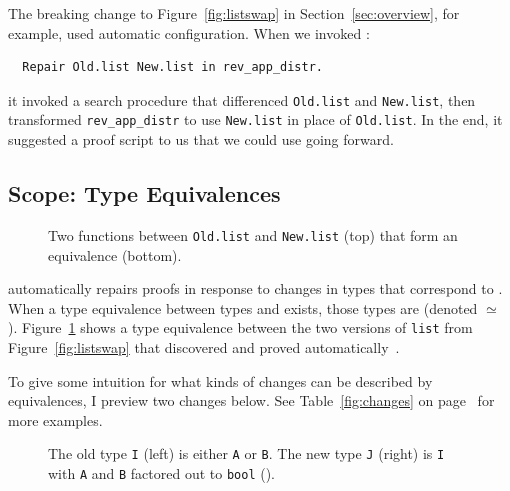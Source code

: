 The breaking change to Figure~\ref{fig:listswap} in Section~\ref{sec:overview}, for example, used automatic configuration.
When we invoked \toolnamec:

\begin{lstlisting}
  Repair Old.list New.list in rev_app_distr.
\end{lstlisting}
it invoked a search procedure that differenced \lstinline{Old.list} and \lstinline{New.list},
then transformed \lstinline{rev_app_distr} to use \lstinline{New.list} in place of \lstinline{Old.list}.
In the end, it suggested a proof script to us that we could use going forward.

\subsection{Scope: Type Equivalences}
\label{sec:pi-scope}

\begin{figure}
\caption{Two functions between \lstinline{Old.list} and \lstinline{New.list} (top) that form an equivalence (bottom).}
\label{fig:equivalence}
\end{figure}

\toolnamec automatically repairs proofs in response to changes in types that correspond to .
When a type equivalence between types \Aa and \B exists, those types are  (denoted \Aa $\simeq$ \B). %
Figure~\ref{fig:equivalence} shows a type equivalence between the two versions of \lstinline{list}
from Figure~\ref{fig:listswap} that \toolnamec discovered and proved automatically~\href{https://github.com/uwplse/pumpkin-pi/blob/v2.0.0/plugin/coq/Swap.v}{}.

To give some intuition for what kinds of changes can be described by equivalences, I preview two changes below.
See Table~\ref{fig:changes} on page~\pageref{fig:changes} for more examples.

\begin{figure}
\begin{minipage}{0.48\columnwidth}

\end{minipage}
\hfill
\begin{minipage}{0.48\columnwidth}

\end{minipage}
\caption{The old type \lstinline{I} (left) is either \lstinline{A} or \lstinline{B}. The new type \lstinline{J} (right) is \lstinline{I} with \lstinline{A} and \lstinline{B} factored out to \lstinline{bool} ().}
\label{fig:equivalence2}
\end{figure}

